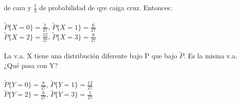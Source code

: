 \documentclass{article}
\begin{document}
        de cara y $\frac{1}{3}$ de probabilidad de qye caiga cruz. Entonces:
        \\
        \\
        $\tilde{P} \lbrace X=0 \rbrace = \frac{1}{27}$, $\tilde{P} \lbrace X=1 \rbrace = \frac{6}{27}$
        \\
        $\tilde{P} \lbrace X=2 \rbrace = \frac{12}{27}$, $\tilde{P} \lbrace X=3 \rbrace = \frac{8}{27}$
        \\
        \\
        La v.a. X tiene una distribución diferente bajo P que bajo $\tilde{P}$. Es la misma v.a. ¿Qué pasa con Y?
        \\
        \\
        $\tilde{P} \lbrace Y=0 \rbrace = \frac{8}{27}$, $\tilde{P} \lbrace Y=1 \rbrace = \frac{12}{27}$
        \\
        $\tilde{P} \lbrace Y=2 \rbrace = \frac{6}{27}$, $\tilde{P} \lbrace Y=3 \rbrace = \frac{1}{27}$
        
\end{document}
